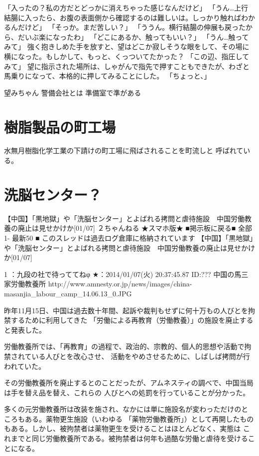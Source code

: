 「入ったの？私の方だとどっかに消えちゃった感じなんだけど」
「うん…上行結腸に入ったら、お腹の表面側から確認するのは難しいは。しっかり触ればわかるんだけど」
「そっか。まだ苦しい？」
「ううん。横行結腸の伸展も戻ったから、だいぶ楽になったわ」
「どこにあるか、触ってもいい？」
「うん…触ってみて」
強く抱きしめた手を放すと、望はどこか寂しそうな眼をして、その場に横になった。もしかして、もっと、くっついてたかった？
「この辺、指圧してみて」
望に指示された場所は、しゃがんで指先で押すこともできたが、わざと馬乗りになって、本格的に押してみることにした。
「ちょっと、」






望みちゃん
警備会社とは
準備室で準がある

\section{樹脂製品の町工場}
水無月樹脂化学工業の下請けの町工場に飛ばされることを町流しと
呼ばれている。

\section{洗脳センター？}
【中国】「黒地獄」や「洗脳センター」とよばれる拷問と虐待施設　中国労働教養の廃止は見せかけか[01/07]
２ちゃんねる ★スマホ版★ ■掲示板に戻る■ 全部 1- 最新50  
■ このスレッドは過去ログ倉庫に格納されています
【中国】「黒地獄」や「洗脳センター」とよばれる拷問と虐待施設　中国労働教養の廃止は見せかけか[01/07]

1 ：九段の社で待っててねφ ★：2014/01/07(火) 20:37:45.87 ID:???
    中国の馬三家労働教養所
    http://www.amnesty.or.jp/news/images/china-masanjia_labour_camp_14.06.13_0.JPG

    昨年11月15日、中国は過去数十年間、起訴や裁判もせずに何十万もの人びとを拘禁するために利用してきた
    「労働による再教育（労働教養）」の施設を廃止すると発表した。

    労働教養所では、「再教育」の過程で、政治的、宗教的、個人的思想や活動で拘禁されている人びとを改心させ、
    活動をやめさせるために、しばしば拷問が行われていた。

    その労働教養所を廃止するとのことだったが、アムネスティの調べで、中国当局は手を替え品を替え、これらの
    人びとへの処罰を行っていることが分かった。

    多くの元労働教養所は改装を施され、なかには単に施設名が変わっただけのところもある。薬物更生施設（いわゆる
    「薬物労働教養所」）として再開したものもある。しかし、被拘禁者は薬物更生を受けることはほとんどなく、実態は
    これまでと同じ労働教養所である。被拘禁者は何年も過酷な労働と虐待を受けることになる。

